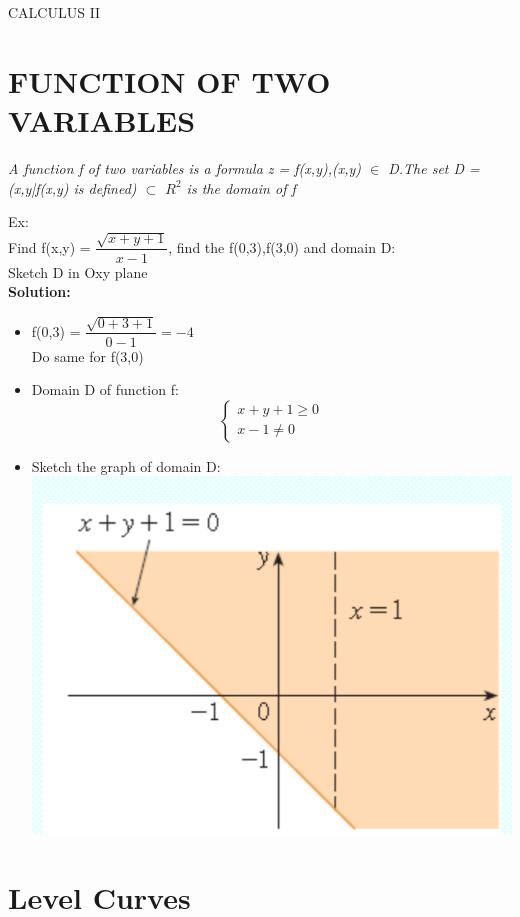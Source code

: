 \documentclass[12pt]{article}
\begin{document}
\begin{center}
CALCULUS II
\end{center}
\section{FUNCTION OF TWO VARIABLES}
\begin{mybox}
\textit{A function f of two variables is a formula z = f(x,y),(x,y) $\in$ D.The set D = {(x,y|f(x,y) is defined)} $\subset$ $R^2$ is the domain of f}
\end{mybox}
Ex: \\
Find f(x,y) = $\dfrac{\sqrt{x + y + 1}}{x - 1}$, find the f(0,3),f(3,0) and domain D: \\
Sketch D in Oxy plane \\
\textbf{Solution:} \\
\begin{itemize}
	\item f(0,3) = $\dfrac{\sqrt{0 + 3 + 1}}{0 - 1} = -4$ \\
		  Do same for f(3,0)
	\item Domain D of function f:
	$$
	\begin{cases}
	x + y + 1 \ge 0 \\
	x - 1 \not = 0
	\end{cases}
	$$
	\item Sketch the graph of domain D: \\
	\includegraphics[scale=0.5]{hinh}
\end{itemize}
\section{Level Curves}
\end{document}
